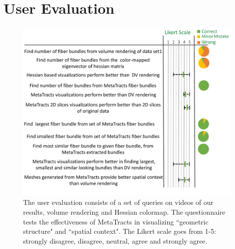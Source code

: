 \section {User Evaluation}
\label {sec:user_eval}
\begin{figure}[tb]
	\centering
	\includegraphics[width=\linewidth,  trim = 0mm 00mm 0mm 0mm, clip]{images_pvis/usereval.pdf}
	\caption{The user evaluation consists of a set of queries on videos of our results, volume rendering and Hessian colormap. The questionnaire tests the effectiveness of MetaTracts in visualizing ``geometric structure" and ``spatial context". The Likert scale goes from 1-5: strongly disagree, disagree, neutral, agree and strongly agree. }
	\label{fig:userstudy}
\end{figure}
